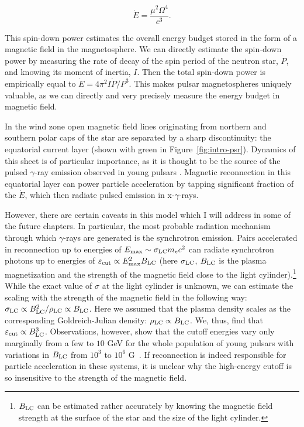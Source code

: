 \begin{equation}
    \dot{E} = \frac{\mu^2 \Omega^4}{c^3}.
\end{equation}

\noindent This spin-down power estimates the overall energy budget stored in the form of a magnetic field in the magnetosphere. We can directly estimate the spin-down power by measuring the rate of decay of the spin period of the neutron star, $\dot{P}$, and knowing its moment of inertia, $I$. Then the total spin-down power is empirically equal to $\dot{E} = 4\pi^2 I \dot{P}/P^3$. This makes pulsar magnetospheres uniquely valuable, as we can directly and very precisely measure the energy budget in magnetic field.

In the wind zone open magnetic field lines originating from northern and southern polar caps of the star are separated by a sharp discontinuity: the equatorial current layer (shown with green in Figure~\ref{fig:intro-psr}). Dynamics of this sheet is of particular importance, as it is thought to be the source of the pulsed $\gamma$-ray emission observed in young pulsars \citep{1996A&A...311..172L,2010ApJ...715.1282B,2010MNRAS.404..767C,2011ASSP...21..165A,2012MNRAS.424.2023P,2015MNRAS.448..606C}. Magnetic reconnection in this equatorial layer can power particle acceleration by tapping significant fraction of the $\dot{E}$, which then radiate pulsed emission in x-$\gamma$-rays.

However, there are certain caveats in this model which I will address in some of the future chapters. In particular, the most probable radiation mechanism through which $\gamma$-rays are generated is the synchrotron emission. Pairs accelerated in reconnection up to energies of $E_{\rm max}\sim \sigma_{\rm LC} m_e c^2$ can radiate synchrotron photons up to energies of $\varepsilon_{\rm cut} \propto E_{\rm max}^2 B_{\rm LC}$ (here $\sigma_{\rm LC}$, $B_{\rm LC}$ is the plasma magnetization and the strength of the magnetic field close to the light cylinder).\footnote{$B_{\rm LC}$ can be estimated rather accurately by knowing the magnetic field strength at the surface of the star and the size of the light cylinder.} While the exact value of $\sigma$ at the light cylinder is unknown, we can estimate the scaling with the strength of the magnetic field in the following way: $\sigma_{\rm LC}\propto B_{\rm LC}^2 / \rho_{\rm LC}\propto B_{\rm LC}$. Here we assumed that the plasma density scales as the corresponding Goldreich-Julian density: $\rho_{\rm LC} \propto B_{\rm LC}$. We, thus, find that $\varepsilon_{\rm cut} \propto B_{\rm LC}^3$. Observations, however, show that the cutoff energies vary only marginally from a few to $10$ GeV for the whole population of young pulsars with variations in $B_{\rm LC}$ from $10^3$ to $10^6$ G~\citep{2013ApJS..208...17A}. If reconnection is indeed responsible for particle acceleration in these systems, it is unclear why the high-energy cutoff is so insensitive to the strength of the magnetic field. 

